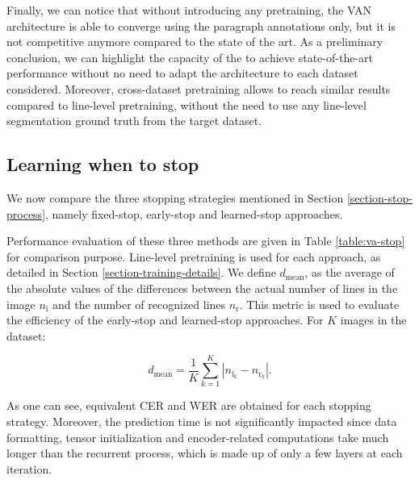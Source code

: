 Finally, we can notice that without introducing any pretraining, the VAN architecture is able to converge using the paragraph annotations only, but it is not competitive anymore compared to the state of the art.
As a preliminary conclusion, we can highlight the capacity of the \modelacc{} to achieve state-of-the-art performance without no need to adapt the architecture to each dataset considered. Moreover, cross-dataset pretraining allows to reach similar results compared to line-level pretraining, without the need to use any line-level segmentation ground truth from the target dataset.


\subsection{Learning when to stop}
\label{section-exp-stop}
We now compare the three stopping strategies mentioned in Section \ref{section-stop-process}, namely fixed-stop, early-stop and learned-stop approaches.

Performance evaluation of these three methods are given in Table \ref{table:va-stop} for comparison purpose. Line-level pretraining is used for each approach, as detailed in Section \ref{section-training-details}. 
We define $d_\mathrm{mean}$, as the average of the absolute values of the differences between the actual number of lines in the image $n_\mathrm{i}$ and the number of recognized lines $n_\mathrm{r}$. This metric is used to evaluate the efficiency of the early-stop and learned-stop approaches. For $K$ images in the dataset:

\begin{equation}
    d_\mathrm{mean} = \frac{1}{K}\displaystyle \sum_{k=1}^{K} |n_{\mathrm{i}_k}-n_{\mathrm{r}_k}|.
\end{equation}


As one can see, equivalent CER and WER are obtained for each stopping strategy. Moreover, the prediction time is not significantly impacted since data formatting, tensor initialization and encoder-related computations take much longer than the recurrent process, which is made up of only a few layers at each iteration.

\begin{table}[!h]
    \caption{Comparison between fixed-stop, early-stop and learned-stop approaches with the \modelacc{} on the test set of the IAM dataset.}
    \centering
    \label{table:va-stop}
\end{table}


